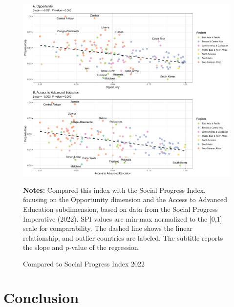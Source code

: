 \begin{figure}[h!]
	\centering
	\includegraphics[width=1\linewidth]{figs/external.pdf}
	\caption{Compared to Social Progress Index 2022}
	\label{fig:external}
  \begin{minipage}{1\linewidth}
	\vspace{0.2cm}
	\footnotesize
	\textbf{Notes:} Compared this index with the Social Progress Index, focusing on the Opportunity dimension and the Access to Advanced Education subdimension, based on data from the Social Progress Imperative (2022). SPI values are min-max normalized to the 
	[0,1] scale for comparability. The dashed line shows the linear relationship, and outlier countries are labeled. The subtitle reports the slope and p-value of the regression.
\end{minipage}
\end{figure}

\section{Conclusion} \label{sec:conclusion}

